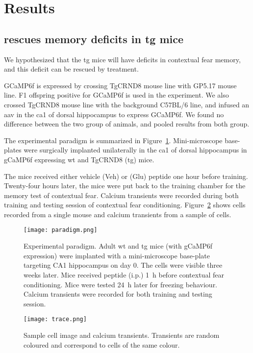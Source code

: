 \section{Results}


\subsection{\tglu rescues memory deficits in \gls{tg} mice}
We hypothesized that the \gls{tg} mice will have deficits in contextual fear memory, and this deficit can be rescued by \tglu treatment.

GCaMP6f is expressed by crossing TgCRND8 mouse line with GP5.17 mouse line. F1 offspring positive for GCaMP6f is used in the experiment. We also crossed TgCRND8 mouse line with the background C57BL/6 line, and infused an \gls{aav} in the \gls{ca1} of dorsal hippocampus to express GCaMP6f. We found no difference between the two group of animals, and pooled results from both group.

The experimental paradigm is summarized in Figure~\ref{f.ad.paradigm}. Mini-microscope base-plates were surgically implanted unilaterally in the \gls{ca1} of dorsal hippocampus in gCaMP6f expressing \gls{wt} and TgCRND8 (\gls{tg}) mice. 

The mice received either vehicle (Veh) or \tglu (Glu) peptide one hour before training. Twenty-four hours later, the mice were put back to the training chamber for the memory test of contextual fear. Calcium transients were recorded during both training and testing session of contextual fear conditioning. Figure~\ref{f.ad.trace} shows cells recorded from a single mouse and calcium transients from a sample of cells.
\begin{figure}[h]
    \texttt{[image: paradigm.png]}
    \caption{Experimental paradigm. Adult \gls{wt} and \gls{tg} mice (with gCaMP6f expression) were implanted with a mini-microscope base-plate targeting CA1 hippocampus on day 0. The cells were visible three weeks later. Mice received \tglu peptide (i.p.) \SI{1}{\hour} before contextual fear conditioning. Mice were tested \SI{24}{\hour} later for freezing behaviour. Calcium transients were recorded for both training and testing session. \label{f.ad.paradigm}}
\end{figure}

\begin{figure}[h]
    \texttt{[image: trace.png]}
    \caption{Sample cell image and calcium transients. Transients are random coloured and correspond to cells of the same colour. \label{f.ad.trace}}
\end{figure}


